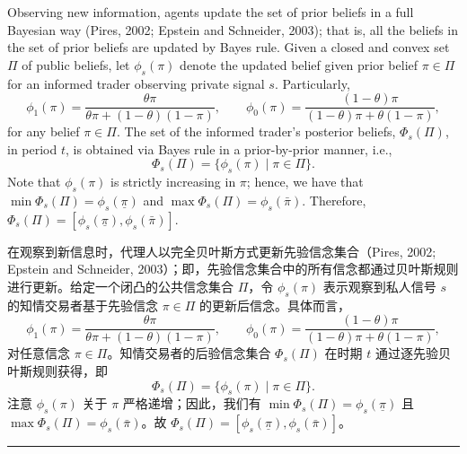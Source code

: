 \documentclass[12pt,a4paper]{article}
\newenvironment{original}{%
  \par\vspace{4pt}\noindent%
  \color{black}%
  \ignorespaces
}{%
  \par\vspace{2pt}%
}
\newenvironment{translation}{%
  \par\vspace{2pt}\noindent%
  \color{transblue}%
  \ignorespaces
}{%
  \par\vspace{4pt}\hrule\vspace{6pt}%
}
\begin{document}
\begin{original}
Observing new information, agents update the set of prior beliefs in a full Bayesian way (Pires, 2002; Epstein and Schneider, 2003); that is, all the beliefs in the set of prior beliefs are updated by Bayes rule. Given a closed and convex set $\Pi$ of public beliefs, let $\phi_s(\pi)$ denote the updated belief given prior belief $\pi \in \Pi$ for an informed trader observing private signal $s$. Particularly,
\[
\phi_1(\pi) = \frac{\theta\pi}{\theta\pi + (1 - \theta)(1 - \pi)}, \qquad
\phi_0(\pi) = \frac{(1 - \theta)\pi}{(1 - \theta)\pi + \theta(1 - \pi)},
\]
for any belief $\pi \in \Pi$. The set of the informed trader's posterior beliefs, $\Phi_s(\Pi)$, in period $t$, is obtained via Bayes rule in a prior-by-prior manner, i.e.,
\[
\Phi_s(\Pi) = \{\phi_s(\pi) \mid \pi \in \Pi\}.
\]
Note that $\phi_s(\pi)$ is strictly increasing in $\pi$; hence, we have that $\min \Phi_s(\Pi) = \phi_s(\underline{\pi})$ and $\max \Phi_s(\Pi) = \phi_s(\bar{\pi})$. Therefore, $\Phi_s(\Pi) = [\phi_s(\underline{\pi}), \phi_s(\bar{\pi})]$.
\end{original}
\begin{translation}
在观察到新信息时，代理人以完全贝叶斯方式更新先验信念集合（Pires, 2002; Epstein and Schneider, 2003）；即，先验信念集合中的所有信念都通过贝叶斯规则进行更新。给定一个闭凸的公共信念集合 $\Pi$，令 $\phi_s(\pi)$ 表示观察到私人信号 $s$ 的知情交易者基于先验信念 $\pi \in \Pi$ 的更新后信念。具体而言，
\[
\phi_1(\pi) = \frac{\theta\pi}{\theta\pi + (1 - \theta)(1 - \pi)}, \qquad
\phi_0(\pi) = \frac{(1 - \theta)\pi}{(1 - \theta)\pi + \theta(1 - \pi)},
\]
对任意信念 $\pi \in \Pi$。知情交易者的后验信念集合 $\Phi_s(\Pi)$ 在时期 $t$ 通过逐先验贝叶斯规则获得，即
\[
\Phi_s(\Pi) = \{\phi_s(\pi) \mid \pi \in \Pi\}.
\]
注意 $\phi_s(\pi)$ 关于 $\pi$ 严格递增；因此，我们有 $\min \Phi_s(\Pi) = \phi_s(\underline{\pi})$ 且 $\max \Phi_s(\Pi) = \phi_s(\bar{\pi})$。故 $\Phi_s(\Pi) = [\phi_s(\underline{\pi}), \phi_s(\bar{\pi})]$。
\end{translation}
\end{document}

